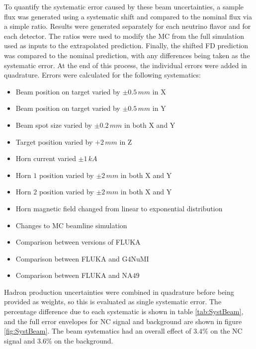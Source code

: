 To quantify the systematic error caused by these beam uncertainties, a sample flux was generated using a systematic shift and compared to the nominal flux via a simple ratio. Results were generated separately for each neutrino flavor and for each detector. The ratios were used to modify the MC from the full simulation used as inputs to the extrapolated prediction. Finally, the shifted FD prediction was compared to the nominal prediction, with any differences being taken as the systematic error. At the end of this process, the individual errors were added in quadrature. Errors were calculated for the following systematics:
\begin{singlespace}
\begin{itemize}
  \item Beam position on target varied by $\pm 0.5\,mm$ in X
  \item Beam position on target varied by $\pm 0.5\,mm$ in Y
  \item Beam spot size varied by $\pm 0.2\,mm$ in both X and Y
  \item Target position varied by $+ 2\, mm$ in Z
  \item Horn current varied $\pm 1\,kA$
  \item Horn $1$ position varied by $\pm 2\,mm$ in both X and Y
  \item Horn $2$ position varied by $\pm 2\,mm$ in both X and Y
  \item Horn magnetic field changed from linear to exponential distribution
  \item Changes to MC beamline simulation
  \item Comparison between versions of FLUKA
  \item Comparison between FLUKA and G$4$NuMI
  \item Comparison between FLUKA and NA$49$
\end{itemize}
\end{singlespace}
\n Hadron production uncertainties were combined in quadrature before being provided as weights, so this is evaluated as single systematic error. The percentage difference due to each systematic is shown in table \ref{tab:SystBeam}, and the full error envelopes for NC signal and background are shown in figure \ref{fig:SystBeam}. The beam systematics had an overall effect of $3.4\%$ on the NC signal and $3.6\%$ on the background.
